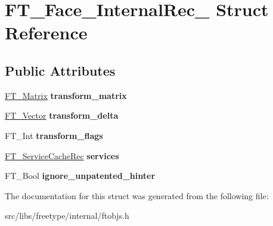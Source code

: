 \hypertarget{struct_f_t___face___internal_rec__}{
\section{FT\_\-Face\_\-InternalRec\_\- Struct Reference}
\label{struct_f_t___face___internal_rec__}
}
\subsection*{Public Attributes}
\begin{DoxyCompactItemize}
\item 
\hypertarget{struct_f_t___face___internal_rec___ab4be2dcda098e6136f5701580d18032d}{
\hyperlink{struct_f_t___matrix__}{FT\_\-Matrix} {\bfseries transform\_\-matrix}}
\label{struct_f_t___face___internal_rec___ab4be2dcda098e6136f5701580d18032d}

\item 
\hypertarget{struct_f_t___face___internal_rec___ab6c2aacdac58312273395b21b8d168c6}{
\hyperlink{struct_f_t___vector__}{FT\_\-Vector} {\bfseries transform\_\-delta}}
\label{struct_f_t___face___internal_rec___ab6c2aacdac58312273395b21b8d168c6}

\item 
\hypertarget{struct_f_t___face___internal_rec___a2495aced35040e1b7c2bc0afcd7a920d}{
FT\_\-Int {\bfseries transform\_\-flags}}
\label{struct_f_t___face___internal_rec___a2495aced35040e1b7c2bc0afcd7a920d}

\item 
\hypertarget{struct_f_t___face___internal_rec___abc3acb3bf5db056bb9c549af04f07963}{
\hyperlink{struct_f_t___service_cache_rec__}{FT\_\-ServiceCacheRec} {\bfseries services}}
\label{struct_f_t___face___internal_rec___abc3acb3bf5db056bb9c549af04f07963}

\item 
\hypertarget{struct_f_t___face___internal_rec___af898fd754c36c3f34c9ce0e88eb101c9}{
FT\_\-Bool {\bfseries ignore\_\-unpatented\_\-hinter}}
\label{struct_f_t___face___internal_rec___af898fd754c36c3f34c9ce0e88eb101c9}

\end{DoxyCompactItemize}


The documentation for this struct was generated from the following file:\begin{DoxyCompactItemize}
\item 
src/libs/freetype/internal/ftobjs.h\end{DoxyCompactItemize}
